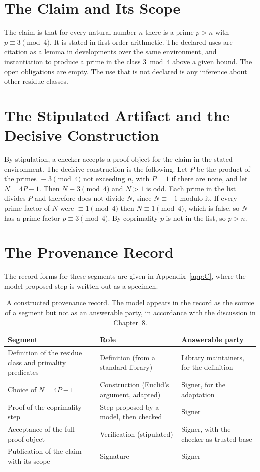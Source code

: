 \documentclass[11pt]{book}
\theoremstyle{definition}
\theoremstyle{remark}
\begin{document}
\section{The Claim and Its Scope}

The claim is that for every natural number $n$ there is a prime $p>n$ with $p\equiv3\pmod 4$. It is stated in first-order arithmetic. The declared uses are citation as a lemma in developments over the same environment, and instantiation to produce a prime in the class $3\bmod 4$ above a given bound. The open obligations are empty. The use that is not declared is any inference about other residue classes.

\section{The Stipulated Artifact and the Decisive Construction}

By stipulation, a checker accepts a proof object for the claim in the stated environment. The decisive construction is the following. Let $P$ be the product of the primes $\equiv3\pmod 4$ not exceeding $n$, with $P=1$ if there are none, and let $N=4P-1$. Then $N\equiv3\pmod 4$ and $N>1$ is odd. Each prime in the list divides $P$ and therefore does not divide $N$, since $N\equiv-1$ modulo it. If every prime factor of $N$ were $\equiv1\pmod 4$ then $N\equiv1\pmod 4$, which is false, so $N$ has a prime factor $p\equiv3\pmod 4$. By coprimality $p$ is not in the list, so $p>n$.

\section{The Provenance Record}

The record forms for these segments are given in Appendix~\ref{app:C}, where the model-proposed step is written out as a specimen.

\begin{table}[ht]
\centering
\begin{tabular}{p{4.2cm}p{3.4cm}p{3.6cm}}
\toprule
Segment & Role & Answerable party \\
\midrule
Definition of the residue class and primality predicates & Definition (from a standard library) & Library maintainers, for the definition \\
Choice of $N=4P-1$ & Construction (Euclid's argument, adapted) & Signer, for the adaptation \\
Proof of the coprimality step & Step proposed by a model, then checked & Signer \\
Acceptance of the full proof object & Verification (stipulated) & Signer, with the checker as trusted base \\
Publication of the claim with its scope & Signature & Signer \\
\bottomrule
\end{tabular}
\caption{A constructed provenance record. The model appears in the record as the source of a segment but not as an answerable party, in accordance with the discussion in Chapter~8.}
\end{table}
\end{document}
